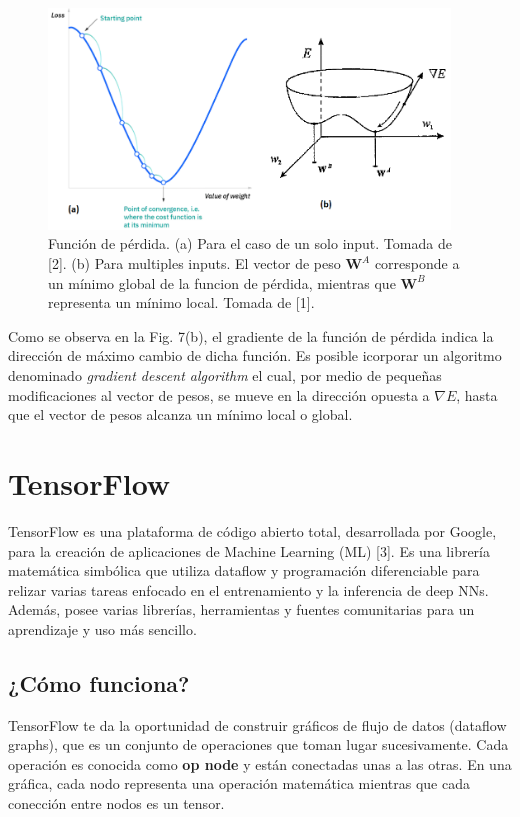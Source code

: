 \documentclass{article}
\begin{document}
\begin{figure}[th!]
   \includegraphics[width=0.95\textwidth]{loss.png}
   \caption{Función de pérdida. (a) Para el caso de un solo input. Tomada de [2]. (b) Para multiples inputs. El vector de peso $\mathbf{W}^A$ corresponde a un mínimo global de la funcion de pérdida, mientras que $\mathbf{W}^B$ representa un mínimo local. Tomada de [1].}
\end{figure}

Como se observa en la Fig. 7(b), el gradiente de la función de pérdida indica la dirección de máximo cambio de dicha función. Es posible icorporar un algoritmo denominado \textit{gradient descent algorithm} el cual, por medio de pequeñas modificaciones al vector de pesos, se mueve en la dirección opuesta a $\nabla E$, hasta que el vector de pesos alcanza un mínimo local o global.

\section{TensorFlow}
TensorFlow es una plataforma de código abierto total, desarrollada por Google, para la creación de aplicaciones de Machine Learning (ML) [3]. Es una librería matemática simbólica que utiliza dataflow y programación diferenciable para relizar varias tareas enfocado en el entrenamiento y la inferencia de deep NNs. Además, posee varias librerías, herramientas y fuentes comunitarias para un aprendizaje y uso más sencillo.

\subsection{¿Cómo funciona?}
TensorFlow te da la oportunidad de construir gráficos de flujo de datos (dataflow graphs), que es un conjunto de operaciones que toman lugar sucesivamente. Cada operación es conocida como \textbf{op node} y están conectadas unas a las otras. En una gráfica, cada nodo representa una operación matemática mientras que cada conección entre nodos es un tensor.
\end{document}
